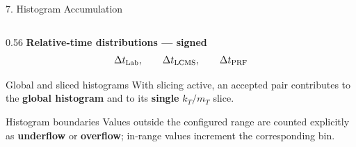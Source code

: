 \documentclass{beamer}
\begin{document}
\begin{frame}{7. Histogram Accumulation}
\begin{columns}[T]
\begin{column}{0.56\textwidth}
\textbf{Relative-time distributions --- signed}
\vspace{-0.3em}
\[
\Delta t_{\rm Lab},\qquad
\Delta t_{\rm LCMS},\qquad
\Delta t_{\rm PRF}
\]
\vspace{-0.35em}

\begin{block}{Global and sliced histograms}
With slicing active, an accepted pair contributes to the \textbf{global histogram} and to its \textbf{single} $k_T/m_T$ slice.
\end{block}

\begin{block}{Histogram boundaries}
Values outside the configured range are counted explicitly as \textbf{underflow} or \textbf{overflow}; in-range values increment the corresponding bin.
\end{block}
\end{column}

\end{columns}

\vfill
\begin{center}
\end{center}

\end{frame}
\end{document}
